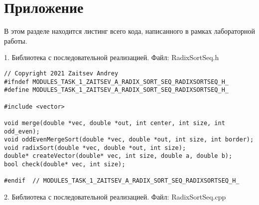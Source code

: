 \documentclass{report}
\begin{document}
\section*{Приложение}
В этом разделе находится листинг всего кода, написанного в рамках лабораторной работы.
\par 1. Библиотека с последовательной реализацией. Файл: RadixSortSeq.h
\begin{lstlisting}
// Copyright 2021 Zaitsev Andrey
#ifndef MODULES_TASK_1_ZAITSEV_A_RADIX_SORT_SEQ_RADIXSORTSEQ_H_
#define MODULES_TASK_1_ZAITSEV_A_RADIX_SORT_SEQ_RADIXSORTSEQ_H_

#include <vector>

void merge(double *vec, double *out, int center, int size, int odd_even);
void oddEvenMergeSort(double *vec, double *out, int size, int border);
void radixSort(double *vec, double *out, int size);
double* createVector(double* vec, int size, double a, double b);
bool check(double* vec, int size);

#endif  // MODULES_TASK_1_ZAITSEV_A_RADIX_SORT_SEQ_RADIXSORTSEQ_H_
\end{lstlisting}
\par 2. Библиотека с последовательной реализацией. Файл: RadixSortSeq.cpp
\end{document}
